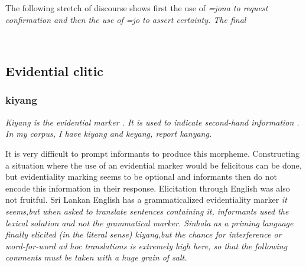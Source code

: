 The following stretch of discourse shows first the use of \em =jona \em to request confirmation and then the use of \em =jo \em to assert certainty. The final 

 \\
 

\subsection{Evidential clitic}\label{sec:morph:Evidentialclitic}

\subsubsection{kiyang}\label{sec:morph:kiyang}
\em Kiyang \em is the evidential marker \citep{Bakker2000convergence,Bakker2006}. It is used to indicate second-hand information  .  In my corpus, I have \em kiyang \em and \em keyang\em, \citet[175]{SmithEtAl2007} report  \em kanyang\em.

 
It is very difficult to prompt informants to produce this morpheme. Constructing a situation where the use of an evidential marker would be felicitous can be done, but evidentiality marking seems to be optional and informants then do not encode this information in their response. Elicitation through English was also not fruitful. Sri Lankan English has a grammaticalized evidentiality marker \em it seems,\em but when asked to translate sentences containing it, informants used the lexical solution  and not the grammatical marker. Sinhala as a priming language finally   elicited (in the literal sense) \em kiyang,\em but the chance for interference or word-for-word \em ad hoc \em translations is extremely high here, so that the following comments must be taken with a huge grain of salt.


